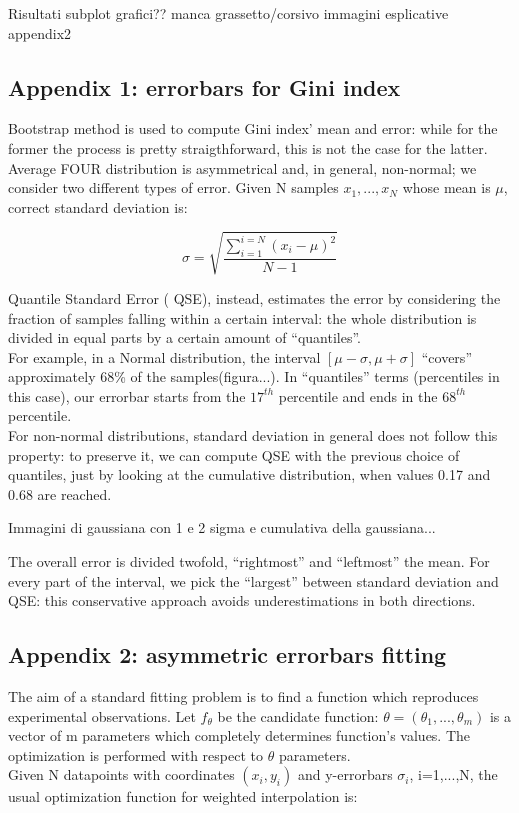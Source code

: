 Risultati
subplot grafici??
manca grassetto/corsivo
immagini esplicative appendix2


\subsection{Appendix 1: errorbars for Gini index}

Bootstrap method is used to compute Gini index' mean and error: while for the former the process is pretty straigthforward, this is not the case for the latter.
Average FOUR distribution is asymmetrical and, in general, non-normal; we consider two different types of error.
Given N samples ${x_1,...,x_N}$ whose mean is $\mu$, correct standard deviation is:

$$
\sigma=\sqrt{\frac{\sum_{i=1}^{i=N}(x_i - \mu)^2}{N-1}}
$$


Quantile Standard Error (	QSE), instead, estimates the error by considering the fraction of samples falling within a certain interval: the whole distribution is divided in equal parts by a certain amount of ``quantiles''.\\
For example, in a Normal distribution, the interval $[\mu -\sigma, \mu +\sigma]$ ``covers'' approximately 68\% of the samples(figura...).
In ``quantiles'' terms (percentiles in this case), our errorbar starts from the $17^{th}$ percentile and ends in the $68^{th}$ percentile.\\
For non-normal distributions, standard deviation in general does not follow this property: to preserve it, we can compute QSE with the previous choice of quantiles, just by looking at the cumulative distribution, when values 0.17 and 0.68 are reached.

Immagini di gaussiana con 1 e 2 sigma e cumulativa della gaussiana...

The overall error is divided twofold, ``rightmost'' and ``leftmost''  the mean. For every part of the interval, we pick the ``largest'' between standard deviation and QSE: this conservative approach avoids underestimations in both directions.




\subsection{Appendix 2: asymmetric errorbars fitting}
The aim of a standard fitting problem is to find a function which reproduces experimental observations.
Let $f_{\theta}$ be the candidate function: $\theta=(\theta_1,...,\theta_m)$ is a vector of m parameters which completely determines function's values.
The optimization is performed with respect to $\theta$ parameters.\\
Given N datapoints with coordinates ${(x_i,y_i)}$ and y-errorbars $\sigma_i$, i=1,...,N, the usual optimization function for weighted interpolation is:

